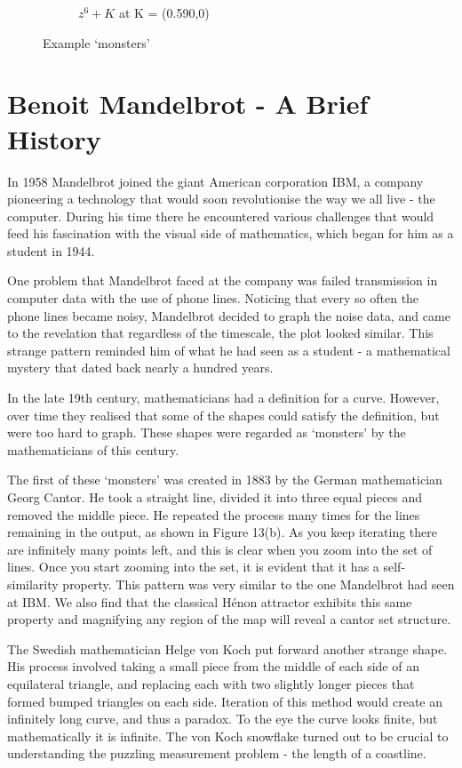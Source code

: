 \documentclass[a4paper]{article}
\begin{document}
\begin{figure}[!ht]
\begin{subfigure}[h]{0.28\textwidth}
        \caption{$z^6 + K$ at K = (0.590,0)}
        \label{fig:tiger}
    \end{subfigure}
    \caption{Example `monsters'}\label{fig:animals}
\end{figure} 

\section{Benoit Mandelbrot - A Brief History}

In 1958 Mandelbrot joined the giant American corporation IBM, a company pioneering a technology that would soon revolutionise the way we all live - the computer. During his time there he encountered various challenges that would feed his fascination with the visual side of mathematics, which began for him as a student in 1944. 

One problem that Mandelbrot faced at the company was failed transmission in computer data with the use of phone lines. Noticing that every so often the phone lines became noisy, Mandelbrot decided to graph the noise data, and came to the revelation that regardless of the timescale, the plot looked similar. This strange pattern reminded him of what he had seen as a student - a mathematical mystery that dated back nearly a hundred years. 

In the late 19th century, mathematicians had a definition for a curve. However, over time they realised that some of the shapes could satisfy the definition, but were too hard to graph. These shapes were regarded as `monsters' by the mathematicians of this century. 

The first of these ‘monsters’ was created in 1883 by the German mathematician Georg Cantor. He took a straight line, divided it into three equal pieces and removed the middle piece. He repeated the process many times for the lines remaining in the output, as shown in Figure 13(b). As you keep iterating there are infinitely many points left, and this is clear when you zoom into the set of lines. Once you start zooming into the set, it is evident that it has a self-similarity property. This pattern was very similar to the one Mandelbrot had seen at IBM. We also find that the classical H{\'e}non attractor exhibits this same property and magnifying any region of the map will reveal a cantor set structure.

The Swedish mathematician Helge von Koch put forward another strange shape. His process involved taking a small piece from the middle of each side of an equilateral triangle, and replacing each with two slightly longer pieces that formed bumped triangles on each side. Iteration of this method would create an infinitely long curve, and thus a paradox. To the eye the curve looks finite, but mathematically it is infinite. The von Koch snowflake turned out to be crucial to understanding the puzzling measurement problem - the length of a coastline. 
\end{document}
